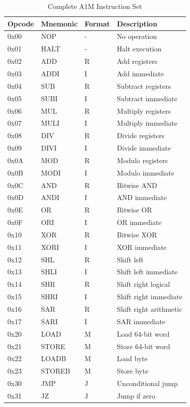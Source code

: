 \documentclass[12pt,a4paper,oneside]{book}
\begin{document}
\begin{table}[H]
\centering
\caption{Complete A1M Instruction Set}
\small
\begin{tabularx}{\textwidth}{|l|l|l|X|}
\hline
\textbf{Opcode} & \textbf{Mnemonic} & \textbf{Format} & \textbf{Description} \\
\hline
0x00 & NOP & - & No operation \\
0x01 & HALT & - & Halt execution \\
0x02 & ADD & R & Add registers \\
0x03 & ADDI & I & Add immediate \\
0x04 & SUB & R & Subtract registers \\
0x05 & SUBI & I & Subtract immediate \\
0x06 & MUL & R & Multiply registers \\
0x07 & MULI & I & Multiply immediate \\
0x08 & DIV & R & Divide registers \\
0x09 & DIVI & I & Divide immediate \\
0x0A & MOD & R & Modulo registers \\
0x0B & MODI & I & Modulo immediate \\
0x0C & AND & R & Bitwise AND \\
0x0D & ANDI & I & AND immediate \\
0x0E & OR & R & Bitwise OR \\
0x0F & ORI & I & OR immediate \\
0x10 & XOR & R & Bitwise XOR \\
0x11 & XORI & I & XOR immediate \\
0x12 & SHL & R & Shift left \\
0x13 & SHLI & I & Shift left immediate \\
0x14 & SHR & R & Shift right logical \\
0x15 & SHRI & I & Shift right immediate \\
0x16 & SAR & R & Shift right arithmetic \\
0x17 & SARI & I & SAR immediate \\
0x20 & LOAD & M & Load 64-bit word \\
0x21 & STORE & M & Store 64-bit word \\
0x22 & LOADB & M & Load byte \\
0x23 & STOREB & M & Store byte \\
0x30 & JMP & J & Unconditional jump \\
0x31 & JZ & J & Jump if zero \\

\end{tabularx}
\end{table}
\end{document}
